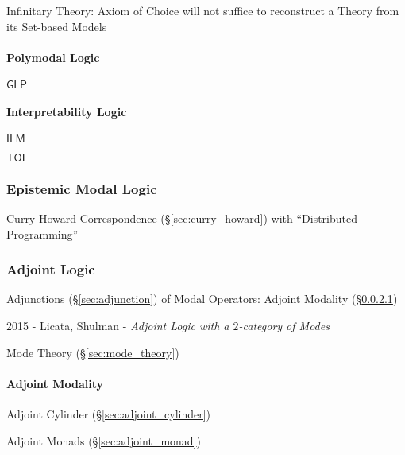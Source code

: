 Infinitary Theory: Axiom of Choice will not suffice to reconstruct a
Theory from its Set-based Models



\paragraph{Polymodal Logic}\label{sec:polymodal_logic}\hfill

$\mathsf{GLP}$



\paragraph{Interpretability Logic}\label{sec:interpretability_logic}\hfill

$\mathsf{ILM}$

$\mathsf{TOL}$



\subsubsection{Epistemic Modal Logic}\label{sec:epistemic_logic}

Curry-Howard Correspondence (\S\ref{sec:curry_howard}) with
``Distributed Programming''



\subsubsection{Adjoint Logic}\label{sec:adjoint_logic}

Adjunctions (\S\ref{sec:adjunction}) of Modal Operators: Adjoint
Modality (\S\ref{sec:adjoint_modality})

2015 - Licata, Shulman - \emph{Adjoint Logic with a $2$-category of Modes}

\fist Mode Theory (\S\ref{sec:mode_theory})



\paragraph{Adjoint Modality}\label{sec:adjoint_modality}\hfill

Adjoint Cylinder (\S\ref{sec:adjoint_cylinder})

Adjoint Monads (\S\ref{sec:adjoint_monad})

